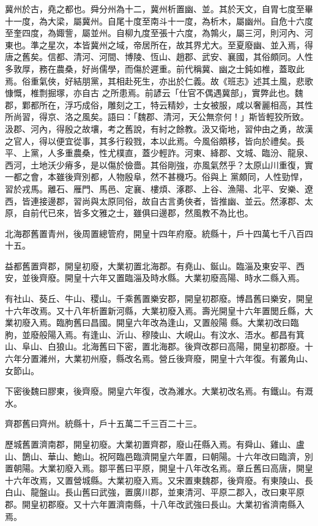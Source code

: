 \begin{pinyinscope}
 冀州於古，堯之都也。舜分州為十二，冀州析置幽、並。其於天文，自胃七度至畢十一度，為大梁，屬冀州。自尾十度至南斗十一度，為析木，屬幽州。自危十六度至奎四度，為娵訾，屬並州。自柳九度至張十六度，為鶉火，屬三河，則河內、河東也。準之星次，本皆冀州之域，帝居所在，故其界尤大。至夏廢幽、並入焉，得唐之舊矣。信都、清河、河間、博陵、恆山、趙郡、武安、襄國，其俗頗同。人性多敦厚，務在農桑，好尚儒學，而傷於遲重。前代稱冀、幽之士鈍如椎，蓋取此焉。俗重氣俠，好結朋黨，其相赴死生，亦出於仁義。故《班志》述其土風，悲歌慷慨，椎剽掘塚，亦自古
 之所患焉。前諺云「仕官不偶遇冀部」，實弊此也。魏郡，鄴都所在，浮巧成俗，雕刻之工，特云精妙，士女被服，咸以奢麗相高，其性所尚習，得京、洛之風矣。語曰：「魏郡、清河，天公無奈何！」斯皆輕狡所致。汲郡、河內，得殷之故壤，考之舊說，有紂之餘教。汲又衛地，習仲由之勇，故漢之官人，得以便宜從事，其多行殺戮，本以此焉。今風俗頗移，皆向於禮矣。長平、上黨，人多重農桑，性尤樸直，蓋少輕詐。河東、絳郡、文城、臨汾、龍泉、西河，土地沃少瘠多，是以傷於儉嗇。其俗剛強，亦風氣然乎？太原山川重復，實一都之會，本雖後齊別都，人物殷阜，然不甚機巧。俗與上
 黨頗同，人性勁悍，習於戎馬。離石、雁門、馬邑、定襄、樓煩、涿郡、上谷、漁陽、北平、安樂、遼西，皆連接邊郡，習尚與太原同俗，故自古言勇俠者，皆推幽、並云。然涿郡、太原，自前代已來，皆多文雅之士，雖俱曰邊郡，然風教不為比也。



 北海郡舊置青州，後周置總管府，開皇十四年府廢。統縣十，戶十四萬七千八百四十五。



 益都舊置齊郡，開皇初廢，大業初置北海郡。有堯山、鋋山。臨淄及東安平、西安，並後齊廢。開皇十六年又置臨淄及時水縣。大業初廢高陽、時水二縣入焉。



 有社山、葵丘、牛山、稷山。千乘舊置樂安郡，開皇初郡廢。博昌舊曰樂安，開皇十六年改焉。又十八年析置新河縣，大業初廢入焉。壽光開皇十六年置閭丘縣，大業初廢入焉。臨朐舊曰昌國。開皇六年改為逢山，又置般陽
 縣。大業初改曰臨朐，並廢般陽入焉。有逢山、沂山、穆陵山、大峴山。有汶水、浯水。都昌有箕山、阜山、白狼山。北海舊曰下密，置北海郡。後齊改郡曰高陽，開皇初郡廢。十六年分置濰州，大業初州廢，縣改名焉。營丘後齊廢，開皇十六年復。有叢角山、女節山。



 下密後魏曰膠東，後齊廢。開皇六年復，改為濰水。大業初改名焉。有鐵山。有溉水。



 齊郡舊曰齊州。統縣十，戶十五萬二千三百二十三。



 歷城舊置濟南郡，開皇初廢。大業初置齊郡，廢山茌縣入焉。有舜山、雞山、盧山、鵲山、華山、鮑山。祝阿臨邑臨濟開皇六年置，曰朝陽。十六年改曰臨濟，別置朝陽。大業初廢入焉。鄒平舊曰平原，開皇十八年改名焉。章丘舊曰高唐，開皇十六年改焉，又置營城縣。大業初廢入焉。又宋置東魏郡，後齊廢。有東陵山、長白山、龍盤山。長山舊曰武強，置廣川郡，並東清河、平原二郡入，改曰東平原郡。開皇初郡廢。又十六年置濟南縣，十八年改武強曰長山。大業初省濟南縣入焉。




\end{pinyinscope}
